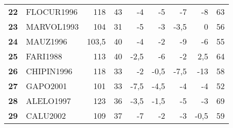 \begin{landscape}
\begin{table}[p]
\begin{tabular}{>{\bfseries}cl*{7}{D{,}{,}{-1}}}
22 & FLOCUR1996 & 118 & 43 & -4 & -5 & -7 & -8 & 63 \\
23 & MARVOL1993 & 104 & 31 & -5 & -3 & -3,5 & 0 & 56 \\
24 & MAUZ1996 & 103,5 & 40 & -4 & -2 & -9 & -6 & 55 \\
25 & FARI1988 & 113 & 40 & -2,5 & -6 & -2 & 2,5 & 64 \\
26 & CHIPIN1996 & 118 & 33 & -2 & -0,5 & -7,5 & -13 & 58 \\
27 & GAPO2001 & 101 & 33 & -7,5 & -4,5 & -4 & -4 & 52 \\
28 & ALELO1997 & 123 & 36 & -3,5 & -1,5 & -5 & -3 & 69 \\
29 & CALU2002 & 109 & 37 & -7 & -2 & -3 & -0,5 & 59 \\
\bottomrule
\end{tabular}
\end{table}

\end{landscape}